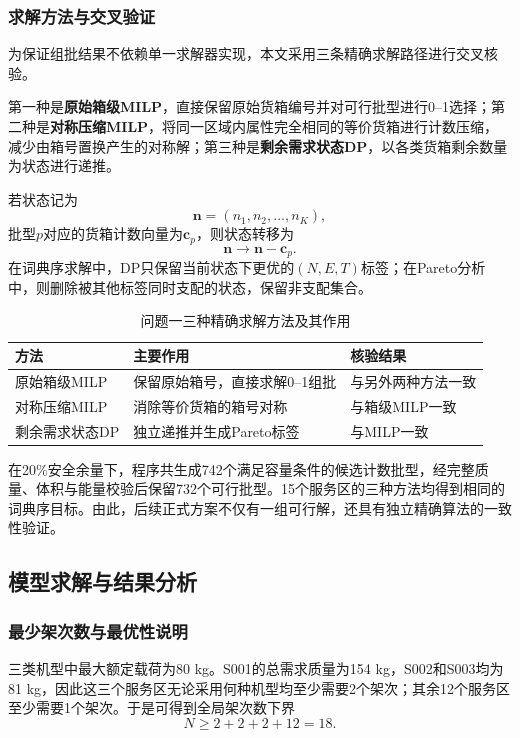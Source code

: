 \documentclass[UTF8,a4paper,12pt]{ctexart}
\begin{document}
\subsubsection{求解方法与交叉验证}

为保证组批结果不依赖单一求解器实现，本文采用三条精确求解路径进行交叉核验。

第一种是\textbf{原始箱级MILP}，直接保留原始货箱编号并对可行批型进行0--1选择；第二种是\textbf{对称压缩MILP}，将同一区域内属性完全相同的等价货箱进行计数压缩，减少由箱号置换产生的对称解；第三种是\textbf{剩余需求状态DP}，以各类货箱剩余数量为状态进行递推。

若状态记为
\[
\mathbf n=(n_1,n_2,\ldots,n_K),
\]
批型$p$对应的货箱计数向量为$\mathbf c_p$，则状态转移为
\[
\mathbf n\rightarrow\mathbf n-\mathbf c_p.
\]
在词典序求解中，DP只保留当前状态下更优的$(N,E,T)$标签；在Pareto分析中，则删除被其他标签同时支配的状态，保留非支配集合。

\begin{table}[H]
\centering
\caption{问题一三种精确求解方法及其作用}
\label{tab:q1_crosscheck}
\begin{tabular}{lll}
\toprule
方法 & 主要作用 & 核验结果\\
\midrule
原始箱级MILP & 保留原始箱号，直接求解0--1组批 & 与另外两种方法一致\\
对称压缩MILP & 消除等价货箱的箱号对称 & 与箱级MILP一致\\
剩余需求状态DP & 独立递推并生成Pareto标签 & 与MILP一致\\
\bottomrule
\end{tabular}
\end{table}

在20\%安全余量下，程序共生成742个满足容量条件的候选计数批型，经完整质量、体积与能量校验后保留732个可行批型。15个服务区的三种方法均得到相同的词典序目标。由此，后续正式方案不仅有一组可行解，还具有独立精确算法的一致性验证。

\subsection{模型求解与结果分析}

\subsubsection{最少架次数与最优性说明}

三类机型中最大额定载荷为80 kg。S001的总需求质量为154 kg，S002和S003均为81 kg，因此这三个服务区无论采用何种机型均至少需要2个架次；其余12个服务区至少需要1个架次。于是可得到全局架次数下界
\[
N\ge 2+2+2+12=18.
\]
\end{document}
